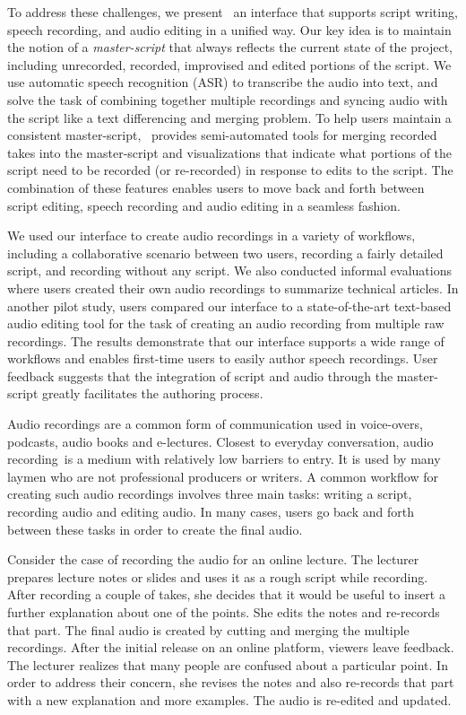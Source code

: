 To address these challenges, we present \systemname\, an interface that supports script writing, speech recording, and audio editing in a unified way. Our key idea is to maintain the notion of a \emph{master-script} that always reflects the current state of the project, including unrecorded, recorded, improvised and edited portions of the script. We  use automatic speech recognition (ASR) to transcribe the audio into text, and solve the task of combining together multiple recordings and syncing audio with the script like a text differencing and merging problem. To help users maintain a consistent master-script, \systemname\ provides semi-automated tools for merging recorded takes into the master-script and visualizations that indicate what portions of the script need to be recorded (or re-recorded) in response to edits to the script. The combination of these features enables users to move back and forth between script editing, speech recording and audio editing in a seamless fashion.

We used our interface to create audio recordings in a variety of workflows, including a collaborative scenario between two users, recording a fairly detailed script, and recording without any script. We also conducted informal evaluations where users created their own audio recordings to summarize technical articles.   In another pilot study, users compared our interface to a state-of-the-art text-based audio editing tool for the task of creating an audio recording from multiple raw recordings. The results demonstrate that our interface supports a wide range of workflows and enables first-time users to  easily author speech recordings. User feedback suggests that the integration of script and audio through the master-script greatly facilitates the authoring process. 

Audio recordings are a common form of communication used in voice-overs, podcasts, audio books and e-lectures. Closest to everyday conversation, audio recording\ is a medium with relatively low barriers to entry. It is used by many laymen who are not professional producers or writers. A common workflow for creating such audio recordings involves three main tasks: writing a script, recording audio and editing audio. In many cases, users go back and forth between these tasks in order to create the final audio. 

Consider the case of recording the audio for an online lecture. The lecturer prepares lecture notes or slides and uses it as a rough script while recording. After recording a couple of takes, she decides that it would be useful to insert a further explanation about one of the points. She edits the notes and re-records that part. The final audio is created by cutting and merging the multiple recordings. After the initial release on an online platform, viewers leave feedback. The lecturer realizes that many people are confused about a particular point. In order to address their concern, she revises the notes and also  re-records that part with a new explanation and more examples. The audio is re-edited and updated. 

